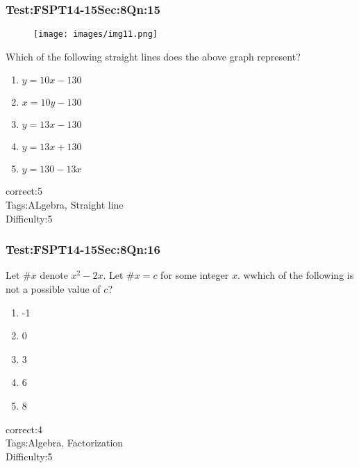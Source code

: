 \documentclass[]{beamer}
\begin{document}
    \begin{frame}
	    \frametitle{Test:FSPT14-15\hspace{2mm}Sec:8\hspace{2mm}Qn:15}
	    \begin{figure}
	    \begin{center}
	    \texttt{[image: images/img11.png]}
	    \end{center}
	    \end{figure}
			Which of the following straight lines does the above graph represent?  
	    \begin{enumerate}
	        \item
	            $y=10x-130$
	        \item
	           $x=10y-130$
	        \item
	           $y=13x-130$
	        \item
	           $y=13x+130$
	        \item
	            $y=130-13x$
	    \end{enumerate}
	    correct:5  \\   
	    Tags:ALgebra, Straight line \\
	    Difficulty:5 \\
    \end{frame}
    \begin{frame}
	    \frametitle{Test:FSPT14-15\hspace{2mm}Sec:8\hspace{2mm}Qn:16}
	    Let $\#x$ denote $x^2-2x$. Let $\#x=c$ for some integer $x$. wwhich of the following is not a possible value of $c$?  
	    \begin{enumerate}
	        \item
	           -1
	        \item
	            0
	        \item
	           3
	        \item
	            6
	        \item
	            8
	    \end{enumerate}
	    correct:4  \\   
	    Tags:Algebra, Factorization    \\
	    Difficulty:5   \\
    \end{frame}
\end{document}
